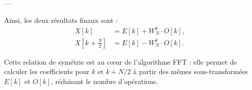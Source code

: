 ---

Ainsi, les deux résultats finaux sont :
\begin{align}
X[k] &= E[k] + W_N^k \cdot O[k], \\[0.5em]
X\left[k+\frac{N}{2}\right] &= E[k] - W_N^k \cdot O[k].
\end{align}

Cette relation de symétrie est au cœur de l’algorithme FFT : elle permet de calculer les coefficients pour $k$ et $k+N/2$ à partir des mêmes sous-transformées $E[k]$ et $O[k]$, réduisant le nombre d’opérations.








